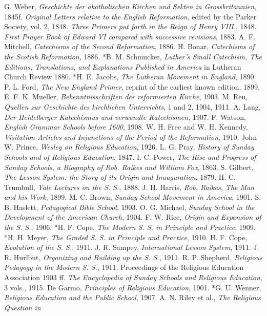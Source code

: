 G. Weber, \emph{Geschichte der akatholischen Kirchen und Sekten in Grossbritannien}, 1845f. \emph{Original Letters relative to the English Reformation}, edited by the Parker Society, vol. 2, 1848. \emph{Three Primers put forth in the Reign of Henry VIII.}, 1848. \emph{First Prayer Book of Edward VI compared with successive revisions}, 1883. A. F. Mitchell, \emph{Catechisms of the Second Reformation}, 1886. H. Bonar, \emph{Catechisms of the Scotish Reformation}, 1886. *B. M. Schmucker, \emph{Luther’s Small Catechism, The Editions, Translations, and Explanations Published in America} in Lutheran Church Review 1880. *H. E. Jacobs, \emph{The Lutheran Movement in England}, 1890. P. L. Ford, \emph{The New England Primer}, reprint of the earliest known edition, 1899. E. F. K. Mueller, \emph{Bekenntnisschriften der reformierten Kirche}, 1903. M. Reu, \emph{Quellen zur Geschichte des kirchlichen Unterrichts}, 1 and 2, 1904, 1911. A. Lang, \emph{Der Heidelberger Katechismus und verwandte Katechismen}, 1907. F. Watson, \emph{English Grammar Schools before 1600}, 1908. W. H. Free and W. H. Kennedy, \emph{Visitation Articles and Injunctions of the Period of the Reformation}, 1910. John W. Prince, \emph{Wesley on Religious Education}, 1926. L. G. Pray, \emph{History of Sunday Schools and of Religious Education}, 1847. I. C. Power, \emph{The Rise and Progress of Sunday Schools, a Biography of Rob. Raikes and William Fox}, 1863. S. Gilbert, \emph{The Lesson System: the Story of its Origin and Inauguration}, 1879. H. C. Trumbull, \emph{Yale Lectures on the S. S.}, 1888. J. H. Harris, \emph{Rob. Raikes, The Man and his Work}, 1899. M. C. Brown, \emph{Sunday School Movement in America}, 1901. S. B. Haslett, \emph{Pedagogical Bible School}, 1903. O. G. Michael, \emph{Sunday School in the Development of the American Church}, 1904. F. W. Rice, \emph{Origin and Expansion of the S. S.}, 1906. *H. F. Cope, \emph{The Modern S. S. in Principle and Practice}, 1909. *H. H. Meyer, \emph{The Graded S. S. in Principle and Practice}, 1910. H. F. Cope, \emph{Evolution of the S. S.}, 1911. J. R. Sampey, \emph{International Lesson System}, 1911. J. R. Hurlbut, \emph{Organizing and Building up the S. S.}, 1911. R. P. Shepherd, \emph{Religious Pedagogy in the Modern S. S.}, 1911. Proceedings of the Religious Education Association 1903 ff. \emph{The Encyclopedia of Sunday Schools and Religious Education}, 3 vols., 1915. De Garmo, \emph{Principles of Religious Education}, 1901. *G. U. Wenner, \emph{Religious Education and the Public School}, 1907. A. N. Riley et al., \emph{The Religious Question in}

